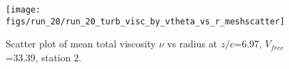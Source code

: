 \begin{figure}[H]
\centering
\texttt{[image: figs/run\_20/run\_20\_turb\_visc\_by\_vtheta\_vs\_r\_meshscatter]}
\caption{Scatter plot of mean total viscosity $\nu$ vs radius at $z/c$=6.97, $V_{free}$=33.39, station 2.}
\label{fig:run_20_turb_visc_by_vtheta_vs_r_meshscatter}
\end{figure}


